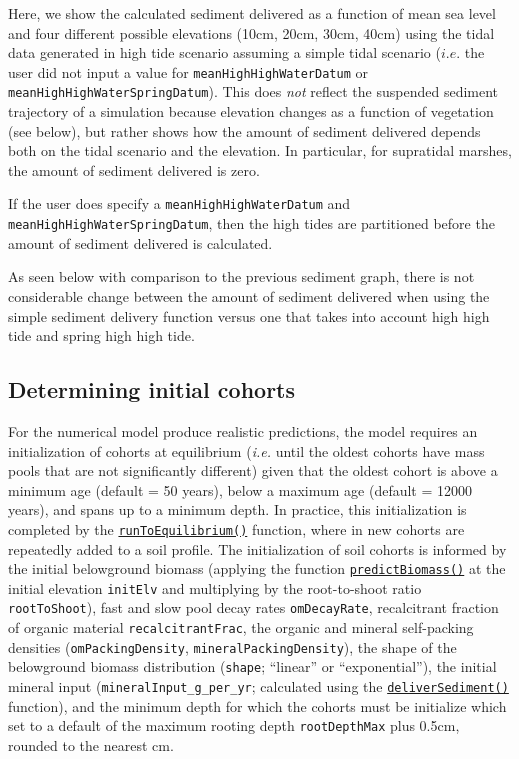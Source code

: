 Here, we show the calculated sediment delivered as a function of mean
sea level and four different possible elevations (10cm, 20cm, 30cm,
40cm) using the tidal data generated in high tide scenario assuming a
simple tidal scenario (\(i.e.\) the user did not input a value for
\texttt{meanHighHighWaterDatum} or
\texttt{meanHighHighWaterSpringDatum}). This does \emph{not} reflect the
suspended sediment trajectory of a simulation because elevation changes
as a function of vegetation (see below), but rather shows how the amount
of sediment delivered depends both on the tidal scenario and the
elevation. In particular, for supratidal marshes, the amount of sediment
delivered is zero.

If the user does specify a \texttt{meanHighHighWaterDatum} and
\texttt{meanHighHighWaterSpringDatum}, then the high tides are
partitioned before the amount of sediment delivered is calculated.

As seen below with comparison to the previous sediment graph, there is
not considerable change between the amount of sediment delivered when
using the simple sediment delivery function versus one that takes into
account high high tide and spring high high tide.

\hypertarget{determining-initial-cohorts}{%
\subsection{Determining initial
cohorts}\label{determining-initial-cohorts}}

For the numerical model produce realistic predictions, the model
requires an initialization of cohorts at equilibrium (\emph{i.e.} until
the oldest cohorts have mass pools that are not significantly different)
given that the oldest cohort is above a minimum age (default = 50
years), below a maximum age (default = 12000 years), and spans up to a
minimum depth. In practice, this initialization is completed by the
\protect\hyperlink{runtoequilibrium}{\texttt{runToEquilibrium()}}
function, where in new cohorts are repeatedly added to a soil profile.
The initialization of soil cohorts is informed by the initial
belowground biomass (applying the function
\protect\hyperlink{predictbiomass}{\texttt{predictBiomass()}} at the
initial elevation \texttt{initElv} and multiplying by the root-to-shoot
ratio \texttt{rootToShoot}), fast and slow pool decay rates
\texttt{omDecayRate}, recalcitrant fraction of organic material
\texttt{recalcitrantFrac}, the organic and mineral self-packing
densities (\texttt{omPackingDensity}, \texttt{mineralPackingDensity}),
the shape of the belowground biomass distribution (\texttt{shape};
``linear'' or ``exponential''), the initial mineral input
(\texttt{mineralInput\_g\_per\_yr}; calculated using the
\protect\hyperlink{deliversediment}{\texttt{deliverSediment()}}
function), and the minimum depth for which the cohorts must be
initialize which set to a default of the maximum rooting depth
\texttt{rootDepthMax} plus 0.5cm, rounded to the nearest cm.

